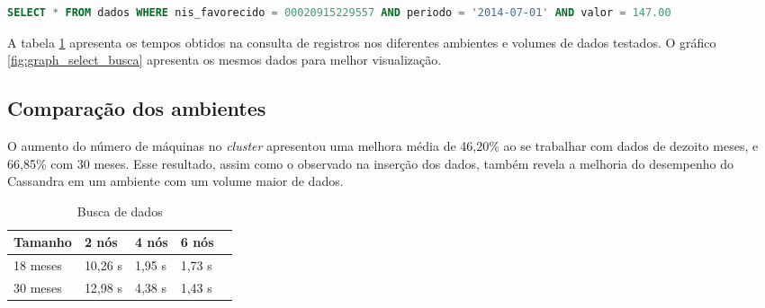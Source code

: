 \begin{lstlisting}[caption={Consulta CQL},label={lst:cql_select},language=SQL]
SELECT * FROM dados WHERE nis_favorecido = 00020915229557 AND periodo = '2014-07-01' AND valor = 147.00 
\end{lstlisting}

A tabela \ref{tab:select_busca} apresenta os tempos obtidos na consulta de registros nos diferentes ambientes e volumes de dados testados. O gráfico \ref{fig:graph_select_busca} apresenta os mesmos dados para melhor visualização.

\subsection{Comparação dos ambientes}
O aumento do número de máquinas no \emph{cluster} apresentou uma melhora média de 46,20\% ao se trabalhar com dados de dezoito meses, e 66,85\% com 30 meses. Esse resultado, assim como o observado na inserção dos dados, também revela a melhoria do desempenho do Cassandra em um ambiente com um volume maior de dados.

\begin{table}[]
	\centering
	\caption{Busca de dados}
	\label{tab:select_busca}
	\begin{tabular}{lllll}
		\textbf{Tamanho} & \textbf{2 nós} & \textbf{4 nós} & \textbf{6 nós} \\ \hline
		18 meses         & 10,26 s        & 1,95 s        & 1,73 s        \\ \hline
		30 meses         & 12,98 s        & 4,38 s        & 1,43 s         \\ \hline
	\end{tabular}
\end{table}

